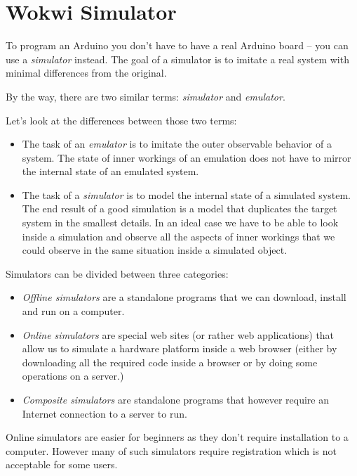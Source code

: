 \documentclass[../sparc.tex]{subfiles}
\begin{document}
\section{Wokwi Simulator}

To program an Arduino you don't have to have a real Arduino board -- you can use
a \emph{simulator} instead.  The goal of a simulator is to imitate a real system
with minimal differences from the original.

By the way, there are two similar terms: \emph{simulator} and \emph{emulator}.

Let's look at the differences\cite{so:simulator-vs-emulator} between those two
terms:

\begin{itemize}
\item The task of an \emph{emulator} is to imitate the outer observable behavior
  of a system.  The state of inner workings of an emulation does not have to
  mirror the internal state of an emulated system.
\item The task of a \emph{simulator} is to model the internal state of a
  simulated system.  The end result of a good simulation is a model that
  duplicates the target system in the smallest details.  In an ideal case we
  have to be able to look inside a simulation and observe all the aspects of
  inner workings that we could observe in the same situation inside a simulated
  object.
\end{itemize}

Simulators can be divided between three categories:
\begin{itemize}
\item \emph{Offline simulators} are a standalone programs that we can download,
  install and run on a computer.
\item \emph{Online simulators} are special web sites (or rather web
  applications) that allow us to simulate a hardware platform inside a web
  browser (either by downloading all the required code inside a browser or by
  doing some operations on a server.)
\item \emph{Composite simulators} are standalone programs that however require
  an Internet connection to a server to run.
\end{itemize}

Online simulators are easier for beginners as they don't require installation to
a computer.  However many of such simulators require registration which is not
acceptable for some users.
\end{document}
